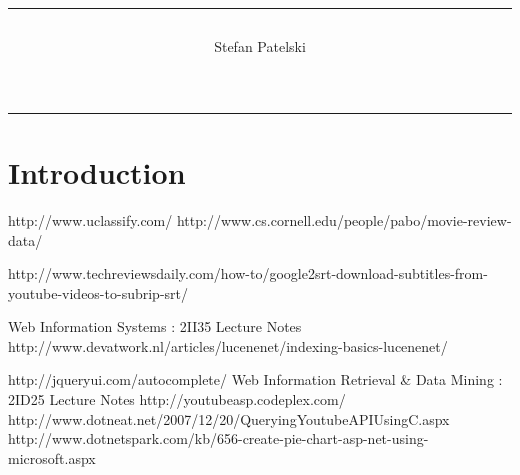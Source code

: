 \documentclass[a4paper,twoside,11pt]{article}
\title{\rule{\linewidth}{.75pt} \center{Title goes here}}
\author{Stefan Patelski}
\begin{document}
\maketitle
\vspace{-2\baselineskip}

\bigskip
\noindent\rule[2.5pt]{\textwidth}{0.75pt}

\newpage

\section{Introduction}




\begin{thebibliography}{1}
 http://www.uclassify.com/
   http://www.cs.cornell.edu/people/pabo/movie-review-data/
  
 http://www.techreviewsdaily.com/how-to/google2srt-download-subtitles-from-youtube-videos-to-subrip-srt/

 Web Information Systems : 2II35 Lecture Notes
http://www.devatwork.nl/articles/lucenenet/indexing-basics-lucenenet/

http://jqueryui.com/autocomplete/
 Web Information Retrieval \& Data Mining : 2ID25 Lecture Notes
http://youtubeasp.codeplex.com/\\http://www.dotneat.net/2007/12/20/QueryingYoutubeAPIUsingC.aspx
http://www.dotnetspark.com/kb/656-create-pie-chart-asp-net-using-microsoft.aspx

  \end{thebibliography}
\end{document}
